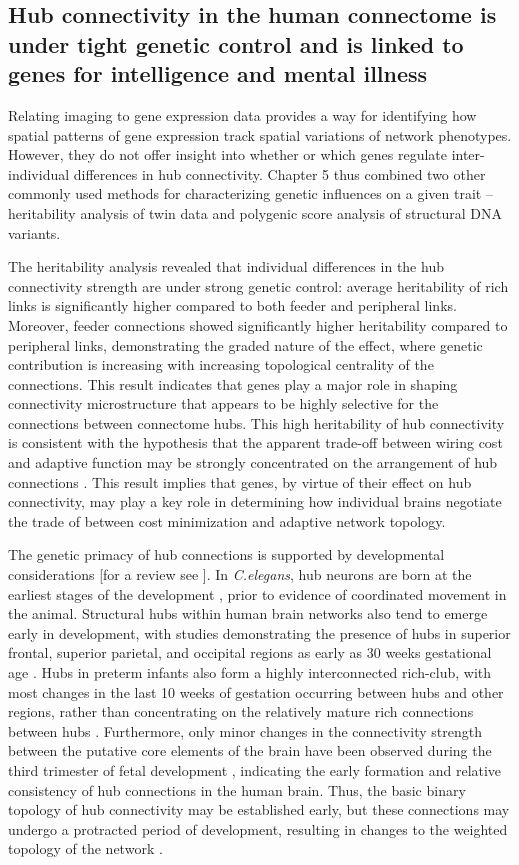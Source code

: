 \subsection*{Hub connectivity in the human connectome is under tight genetic control and is linked to genes for intelligence and mental illness}

Relating imaging to gene expression data provides a way for identifying how spatial patterns of gene expression track spatial variations of network phenotypes. However, they do not offer insight into whether or which genes regulate inter-individual differences in hub connectivity. Chapter 5 thus combined two other commonly used methods for characterizing genetic influences on a given trait -- heritability analysis of twin data and polygenic score analysis of structural DNA variants.

The heritability analysis revealed that individual differences in the hub connectivity strength are under strong genetic control: average heritability of  rich links is significantly higher compared to both feeder and peripheral links. Moreover, feeder connections showed significantly higher heritability compared to peripheral links, demonstrating the graded nature of the effect, where genetic contribution is increasing with increasing topological centrality of the connections. This result indicates that genes play a major role in shaping connectivity microstructure that appears to be highly selective for the connections between connectome hubs. This high heritability of hub connectivity is consistent with the hypothesis that the apparent trade-off between wiring cost and adaptive function may be strongly concentrated on the arrangement of hub connections \citep{Bullmore2012}. This result implies that genes, by virtue of their effect on hub connectivity, may play a key role in determining how individual brains negotiate the trade of between cost minimization and adaptive network topology. 

The genetic primacy of hub connections is supported by developmental considerations [for a review see \citep{Oldham2018}]. In \textit{C.elegans}, hub neurons are born at the earliest stages of the development \citep{Varier2011}, prior to evidence of coordinated movement in the animal. Structural hubs within  human brain networks also tend to emerge early in development, with studies demonstrating the presence of hubs in superior frontal, superior parietal, and occipital regions as early as 30 weeks gestational age \citep{Ball2014}. Hubs in preterm infants also form a highly interconnected rich-club, with most changes in the last 10 weeks of gestation occurring between hubs and other regions, rather than concentrating on the relatively mature rich connections between hubs \citep{Ball2014}. Furthermore, only minor changes in the connectivity strength between the putative core elements of the brain have been observed during the third trimester of fetal development \citep{Batalle2017}, indicating the early formation and relative consistency of hub connections in the human brain. Thus, the basic binary topology of hub connectivity may be established early, but these connections may undergo a protracted period of development, resulting in changes to the weighted topology of the network \citep{Baker2015a,Oldham2018}.

